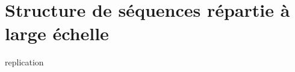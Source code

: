 \section{Structure de séquences répartie à large échelle}

\begin{frame}
  replication
\end{frame}

